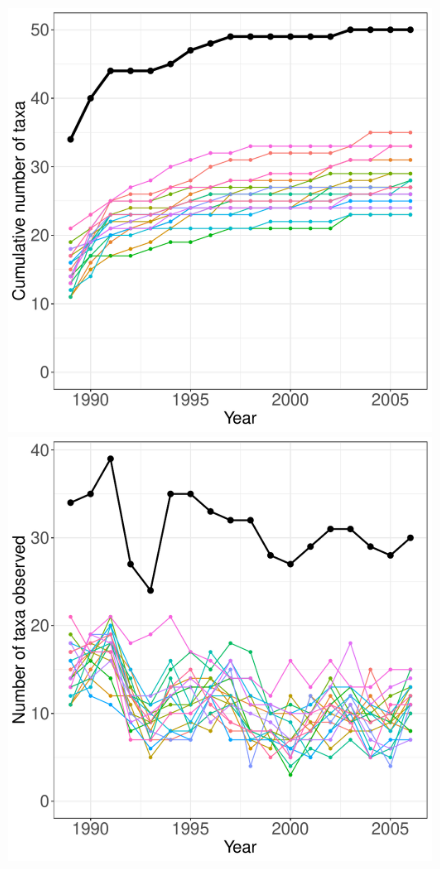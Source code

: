 \documentclass[11pt, oneside]{article}
\begin{document}
\begin{figure}[h!]
\centering
\includegraphics[scale = 0.4]{cdr-grasshopper-compagnoni_species_accumulation_curve.pdf}
\includegraphics[scale = 0.4]{cdr-grasshopper-compagnoni_num_taxa_over_time.pdf}

\end{figure}
\end{document}
